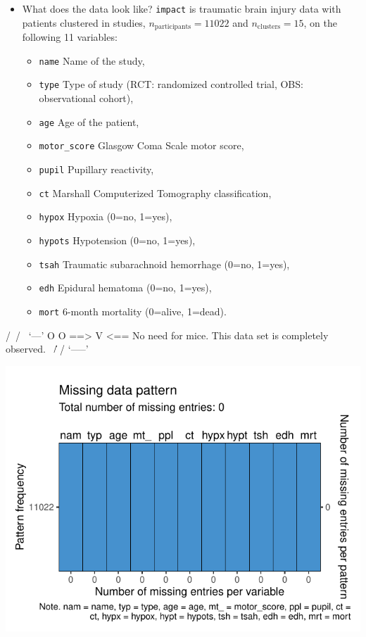 \documentclass[
]{jss}
\providecommand{\tightlist}{%
  \setlength{\itemsep}{0pt}\setlength{\parskip}{0pt}}
\begin{document}
\begin{itemize}
\item
  What does the data look like? \texttt{impact} is traumatic brain
  injury data with patients clustered in studies,
  \(n_{\text{participants}} = 11022\) and \(n_{\text{clusters}} = 15\),
  on the following 11 variables:

  \begin{itemize}
  \tightlist
  \item
    \texttt{name} Name of the study,
  \item
    \texttt{type} Type of study (RCT: randomized controlled trial, OBS:
    observational cohort),
  \item
    \texttt{age} Age of the patient,
  \item
    \texttt{motor\_score} Glasgow Coma Scale motor score,
  \item
    \texttt{pupil} Pupillary reactivity,
  \item
    \texttt{ct} Marshall Computerized Tomography classification,
  \item
    \texttt{hypox} Hypoxia (0=no, 1=yes),
  \item
    \texttt{hypots} Hypotension (0=no, 1=yes),
  \item
    \texttt{tsah} Traumatic subarachnoid hemorrhage (0=no, 1=yes),
  \item
    \texttt{edh} Epidural hematoma (0=no, 1=yes),
  \item
    \texttt{mort} 6-month mortality (0=alive, 1=dead).
  \end{itemize}
\end{itemize}

\begin{CodeChunk}
\begin{CodeOutput}
 /\     /\
{  `---'  }
{  O   O  }
==>  V <==  No need for mice. This data set is completely observed.
 \  \|/  /
  `-----'
\end{CodeOutput}


\begin{center}\includegraphics{Manuscript_files/figure-latex/impact-1} \end{center}

\end{CodeChunk}
\end{document}
